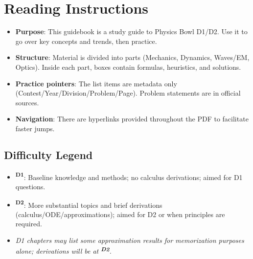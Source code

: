 ﻿\documentclass[12pt,a4paper]{article}
\newcommand{\DOne}{\texorpdfstring{\textsuperscript{\textbf{D1}}}{ D1}}
\newcommand{\DTwo}{\texorpdfstring{\textsuperscript{\textbf{D2}}}{ D2}}
\begin{document}
\section*{Reading Instructions}
\begin{itemize}[leftmargin=*]
  \item \textbf{Purpose}: This guidebook is a study guide to Physics Bowl D1/D2. Use it to go over key concepts and trends, then practice.
  \item \textbf{Structure}: Material is divided into parts (Mechanics, Dynamics, Waves/EM, Optics). Inside each part, boxes contain formulas, heuristics, and solutions.
  \item \textbf{Practice pointers}: The list items are metadata only (Contest/Year/Division/Problem/Page). Problem statements are in official sources.
  \item \textbf{Navigation}: There are hyperlinks provided throughout the PDF to facilitate faster jumps.
\end{itemize}


\subsection*{Difficulty Legend}
\begin{itemize}[leftmargin=*]
  \item \textbf{\DOne}: Baseline knowledge and methods; no calculus derivations; aimed for D1 questions.
  \item \textbf{\DTwo}: More substantial topics and brief derivations (calculus/ODE/approximations); aimed for D2 or when principles are required.
  \item \textit{D1 chapters may list some approximation results for memorization purposes alone; derivations will be at \DTwo.}
\end{itemize}

\end{document}
